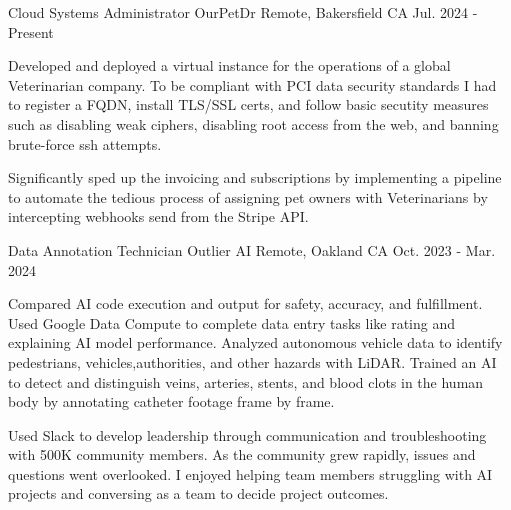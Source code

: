 

\begin{cventries}

  \cventry
    {Cloud Systems Administrator} %
    {OurPetDr} %
    {Remote, Bakersfield CA} %
    {Jul. 2024 - Present} %
    {
      \begin{cvitems} %
		  \item {Developed and deployed a virtual instance for the operations of a global Veterinarian company. To be compliant with PCI data security standards I had to register a FQDN, install TLS/SSL certs, and follow basic secutity measures such as disabling weak ciphers, disabling root access from the web, and banning brute-force ssh attempts. }
		  \item {Significantly sped up the invoicing and subscriptions by implementing a pipeline to automate the tedious process of assigning pet owners with Veterinarians by intercepting webhooks send from the Stripe API.}
      \end{cvitems}
    }

  \cventry
    {Data Annotation Technician} %
    {Outlier AI} %
    {Remote, Oakland CA} %
    {Oct. 2023 - Mar. 2024} %
    {
      \begin{cvitems} %
		  \item {Compared AI code execution and output for safety, accuracy, and fulfillment. Used Google Data Compute to complete data entry tasks like rating and explaining AI model performance. Analyzed autonomous vehicle data to identify pedestrians, vehicles,authorities, and other hazards with LiDAR. Trained an AI to detect and distinguish veins, arteries, stents, and blood clots in the human body by annotating catheter footage frame by frame.}
		  \item {Used Slack to develop leadership through communication and troubleshooting with 500K community members. As the community grew rapidly, issues and questions went overlooked. I enjoyed helping team members struggling with AI projects and conversing as a team to decide project outcomes.}
      \end{cvitems}
    }


\end{cventries}
